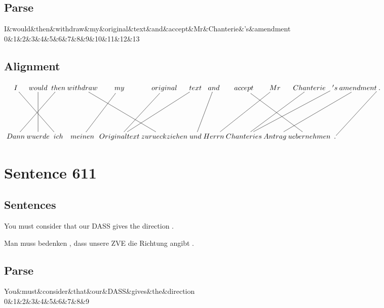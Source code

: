 \documentclass{report}
\begin{document}
\subsection*{Parse}
\begin{dependency}[theme=simple]
\begin{deptext}[column sep=.5cm, row sep=.1ex]
I\&would\&then\&withdraw\&my\&original\&text\&and\&accept\&Mr\&Chanterie\&'s\&amendment\\
0\&1\&2\&3\&4\&5\&6\&7\&8\&9\&10\&11\&12\&13\\
\end{deptext}
\end{dependency}


\subsection*{Alignment}
\scriptsize{
$
\xymatrix@C-2.3pc{
I \ar @{-} [ddrr] & would \ar @{-} [dd] & then \ar @{-} [ddll] & withdraw \ar @{-} [ddrr] & my \ar @{-} [ddl] & original \ar @{-} [ddl] & text \ar @{-} [ddll] & and \ar @{-} [ddl] & accept \ar @{-} [ddrr] & Mr \ar @{-} [ddll] & Chanterie \ar @{-} [ddll] & 's \ar @{-} [ddlll] & amendment \ar @{-} [ddlll] & . \ar @{-} [ddll]\\\\
Dann & wuerde & ich & meinen & Originaltext & zurueckziehen & und & Herrn & Chanteries & Antrag & uebernehmen & .
}$}
\newpage\section*{Sentence 611}

\subsection*{Sentences}
You must consider that our DASS gives the direction .

\noindent Man muss bedenken , dass unsere ZVE die Richtung angibt .



\subsection*{Parse}
\begin{dependency}[theme=simple]
\begin{deptext}[column sep=.5cm, row sep=.1ex]
You\&must\&consider\&that\&our\&DASS\&gives\&the\&direction\\
0\&1\&2\&3\&4\&5\&6\&7\&8\&9\\
\end{deptext}
\end{dependency}
\end{document}

